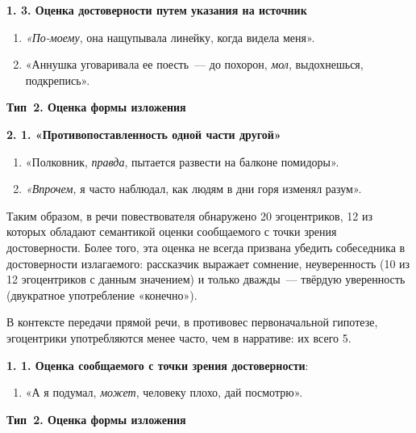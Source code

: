 \documentclass{kursa4}
\begin{document}
{{      \textbf{1. 3. Оценка достоверности путем указания на источник}
        \setcounter{saveenum}{\value{enumi}}
        \begin{enumerate}
        \setcounter{enumi}{\value{saveenum}}
        \item \textit{«По-моему}, она нащупывала линейку, когда видела меня».
        \item «Аннушка уговаривала ее поесть~--- до похорон, \textit{мол},
        выдохнешься, подкрепись».
      \end{enumerate}

      {\centering
      \textbf{Тип~2. Оценка формы изложения}
      \par}

      \textbf{2. 1. «Противопоставленность одной части другой»}
        \setcounter{saveenum}{\value{enumi}}
        \begin{enumerate}
        \setcounter{enumi}{\value{saveenum}}
        \item «Полковник, \textit{правда}, пытается развести на балконе помидоры».
        \item \textit{«Впрочем,} я часто наблюдал, как людям в дни горя изменял разум».
      \end{enumerate}

      Таким образом, в речи повествователя обнаружено 20 эгоцентриков, 12
      из которых обладают семантикой оценки сообщаемого с точки зрения
      достоверности. Более того, эта оценка не всегда призвана убедить
      собеседника в достоверности излагаемого: рассказчик выражает сомнение,
      неуверенность (10 из 12 эгоцентриков с данным значением) и только
      дважды~--- твёрдую уверенность (двукратное употребление «конечно»). 

      В контексте передачи прямой речи, в противовес первоначальной
      гипотезе, эгоцентрики употребляются менее часто, чем в нарративе: их
      всего 5. 

      {\par}

      \textbf{1. 1. Оценка сообщаемого с точки
      зрения достоверности}:
      \begin{enumerate}
        \item «А я подумал, \textit{может}, человеку плохо, дай посмотрю».
      \end{enumerate}

      {\centering
      \textbf{Тип~2. Оценка формы изложения }
      \par}

}}
\end{document}
